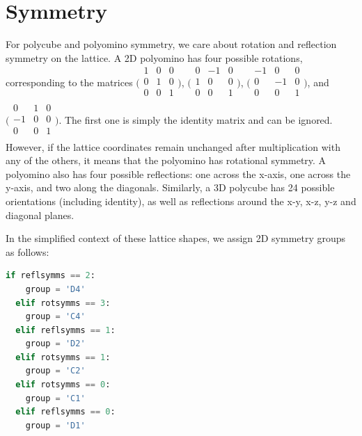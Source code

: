 \section{Symmetry}

For polycube and polyomino symmetry, we care about rotation and reflection symmetry on the lattice. A 2D polyomino has four possible rotations, corresponding to the matrices $\big(\begin{smallmatrix}
    1 & 0 & 0\\
    0 & 1 & 0\\
    0 & 0 & 1\\
\end{smallmatrix}\big)$, $\big(\begin{smallmatrix}
    0 & -1 & 0\\
    1 & 0 & 0\\
    0 & 0 & 1\\
\end{smallmatrix}\big)$, $\big(\begin{smallmatrix}
    -1 & 0 & 0\\
    0 & -1 & 0\\
    0 & 0 & 1\\
\end{smallmatrix}\big)$, and $\big(\begin{smallmatrix}
    0 & 1 & 0\\
    -1 & 0 & 0\\
    0 & 0 & 1\\
\end{smallmatrix}\big)$. The first one is simply the identity matrix and can be ignored. However, if the lattice coordinates remain unchanged after multiplication with any of the others, it means that the polyomino has rotational symmetry. A polyomino also has four possible reflections: one across the x-axis, one across the y-axis, and two along the diagonals. Similarly, a 3D polycube has 24 possible orientations (including identity), as well as reflections around the x-y, x-z, y-z and diagonal planes.

In the simplified context of these lattice shapes, we assign 2D symmetry groups as follows:
\begin{lstlisting}[language=Python]
  if reflsymms == 2:
    group = 'D4'
  elif rotsymms == 3:
    group = 'C4'
  elif reflsymms == 1:
    group = 'D2'
  elif rotsymms == 1:
    group = 'C2'
  elif rotsymms == 0:
    group = 'C1'
  elif reflsymms == 0:
    group = 'D1'
\end{lstlisting}

